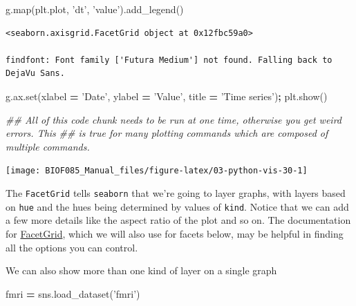 \documentclass[
  letterpaper,
]{scrbook}
\newenvironment{Shaded}{\begin{snugshade}}{\end{snugshade}}
\newcommand{\BuiltInTok}[1]{#1}
\newcommand{\CommentTok}[1]{\textcolor[rgb]{0.56,0.35,0.01}{\textit{#1}}}
\newcommand{\NormalTok}[1]{#1}
\newcommand{\OperatorTok}[1]{\textcolor[rgb]{0.81,0.36,0.00}{\textbf{#1}}}
\newcommand{\StringTok}[1]{\textcolor[rgb]{0.31,0.60,0.02}{#1}}
\begin{document}
\begin{Shaded}
\begin{Highlighting}[]
\NormalTok{g.}\BuiltInTok{map}\NormalTok{(plt.plot, }\StringTok{'dt'}\NormalTok{, }\StringTok{'value'}\NormalTok{).add_legend()}
\end{Highlighting}
\end{Shaded}

\begin{verbatim}
<seaborn.axisgrid.FacetGrid object at 0x12fbc59a0>

findfont: Font family ['Futura Medium'] not found. Falling back to DejaVu Sans.
\end{verbatim}

\begin{Shaded}
\begin{Highlighting}[]
\NormalTok{g.ax.}\BuiltInTok{set}\NormalTok{(xlabel }\OperatorTok{=} \StringTok{'Date'}\NormalTok{,}
\NormalTok{        ylabel }\OperatorTok{=} \StringTok{'Value'}\NormalTok{,}
\NormalTok{        title }\OperatorTok{=} \StringTok{'Time series'}\NormalTok{)}\OperatorTok{;}
\NormalTok{plt.show()}

\CommentTok{## All of this code chunk needs to be run at one time, otherwise you get weird errors. This}
\CommentTok{## is true for many plotting commands which are composed of multiple commands. }
\end{Highlighting}
\end{Shaded}

\begin{center}\texttt{[image: BIOF085\_Manual\_files/figure-latex/03-python-vis-30-1]} \end{center}

The \texttt{FacetGrid} tells \texttt{seaborn} that we're going to layer graphs, with layers based on \texttt{hue} and the hues being determined by values of \texttt{kind}. Notice that we can add a few more details like the aspect ratio of the plot and so on. The documentation for \href{https://seaborn.pydata.org/generated/seaborn.FacetGrid.html}{FacetGrid}, which we will also use for facets below, may be helpful in finding all the options you can control.

We can also show more than one kind of layer on a single graph

\begin{Shaded}
\begin{Highlighting}[]
\NormalTok{fmri }\OperatorTok{=}\NormalTok{ sns.load_dataset(}\StringTok{'fmri'}\NormalTok{)}
\end{Highlighting}
\end{Shaded}
\end{document}
